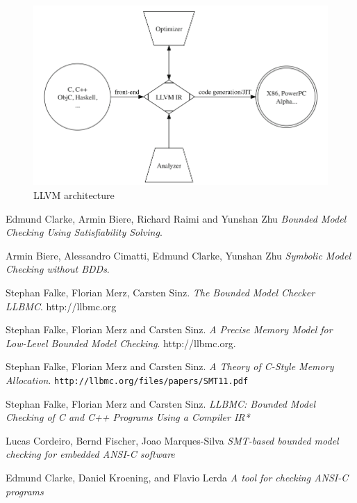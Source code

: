 \documentclass[14pt]{article}
\begin{document}
\begin{figure}[htb!]
  \begin{centering}
    \includegraphics[scale=0.5]{figures/llvm_architecture}\par
  \end{centering}
  \caption{LLVM architecture}
  \label{fig:llvm_architecture}
\end{figure}

\begin{thebibliography}{9}
Edmund Clarke, Armin Biere, Richard Raimi and Yunshan Zhu
\textit{Bounded Model Checking Using Satisfiability Solving}.

Armin Biere, Alessandro Cimatti, Edmund Clarke, Yunshan Zhu
\textit{Symbolic Model Checking without BDDs}. 

Stephan Falke, Florian Merz, Carsten Sinz.
\textit{The Bounded Model Checker LLBMC}. 
http://llbmc.org

Stephan Falke, Florian Merz and Carsten Sinz.
\textit{A Precise Memory Model for Low-Level Bounded Model Checking}.
http://llbmc.org.

Stephan Falke, Florian Merz and Carsten Sinz.
\textit{A Theory of C-Style Memory Allocation}.
\texttt{http://llbmc.org/files/papers/SMT11.pdf}

Stephan Falke, Florian Merz and Carsten Sinz.
\textit{LLBMC: Bounded Model Checking of C and C++ Programs Using a Compiler IR*}

Lucas Cordeiro, Bernd Fischer, Joao Marques-Silva 
\textit{SMT-based bounded model checking for embedded ANSI-C software}

Edmund Clarke, Daniel Kroening, and Flavio Lerda
\textit{A tool for checking ANSI-C programs}

\end{thebibliography}
\end{document}
